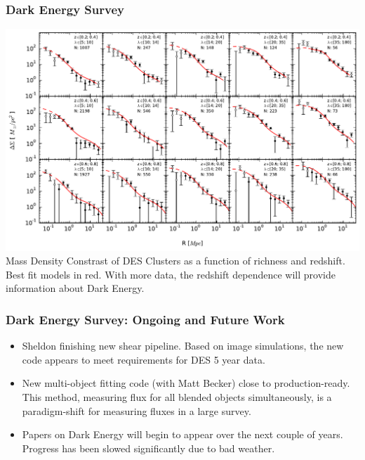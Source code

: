 \documentclass{beamer}
\begin{document}
{\begin{columns}
    \end{columns}

}

\frame
{

    \frametitle{Dark Energy Survey}

    \fontsize{9}{0.8\baselineskip}

    \includegraphics[width=\textwidth]{clusters-randoms_noqc_bestfit.pdf}
    \newline
    {\small Mass Density Constrast of DES Clusters as a function of richness
    and redshift.  Best fit models in red.  With more data, the redshift dependence will provide
    information about Dark Energy.}


}

\frame
{

    \frametitle{Dark Energy Survey: Ongoing and Future Work}

    \fontsize{9}{0.8\baselineskip}



            \begin{itemize}

                \item Sheldon finishing new shear pipeline.  Based on image
                    simulations, the new code appears to meet requirements for
                    DES 5 year data.

                \item New multi-object fitting code (with Matt Becker) close to
                    production-ready.  This method, measuring flux for all
                    blended objects simultaneously, is a paradigm-shift for
                    measuring fluxes in a large survey.

                \item Papers on Dark Energy will begin to appear over the next couple
                    of years.  
                    Progress has been slowed significantly due to bad weather.

            \end{itemize}


}
\end{document}
